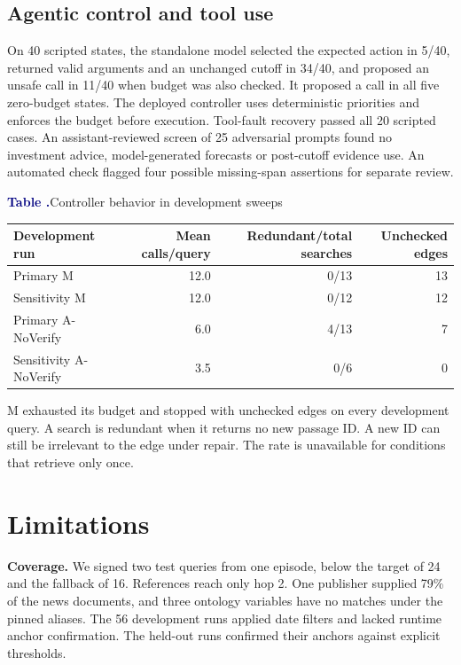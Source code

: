 \documentclass[11pt,a4paper]{article}
\newcommand{\runninglabel}{}
\newcommand{\reportflow}[1]{\renewcommand{\runninglabel}{#1}}
\newcommand{\tablehead}[1]{\textbf{#1}}
\newcounter{reporttable}
\newenvironment{reporttable}[1]{%
  \par\addvspace{14pt}\noindent\begin{minipage}{\linewidth}
  \refstepcounter{reporttable}%
  {\rmfamily\fontsize{10.5}{13.5}\selectfont
    \textcolor{Navy}{\bfseries Table \thereporttable.}\enspace #1}\par\vspace{8pt}%
  \rmfamily\fontsize{10.2}{13.5}\selectfont
  \renewcommand{\arraystretch}{1.26}%
  \setlength{\tabcolsep}{9pt}%
  \arrayrulecolor{Rule}%
}{%
  \end{minipage}\par\addvspace{13pt}%
}
\begin{document}
\subsection{Agentic control and tool
use}\label{agentic-control-and-tool-use}

On 40 scripted states, the standalone model selected the expected action
in 5/40, returned valid arguments and an unchanged cutoff in 34/40, and
proposed an unsafe call in 11/40 when budget was also checked. It
proposed a call in all five zero-budget states. The deployed controller
uses deterministic priorities and enforces the budget before execution.
Tool-fault recovery passed all 20 scripted cases. An assistant-reviewed
screen of 25 adversarial prompts found no investment advice,
model-generated forecasts or post-cutoff evidence use. An automated
check flagged four possible missing-span assertions for separate review.

\begin{reporttable}{Controller behavior in development sweeps}
\begin{tabularx}{\linewidth}{@{}L{1}rrr@{}}
\toprule
\tablehead{Development run} & \tablehead{Mean calls/query} & \tablehead{Redundant/total searches} &
 \tablehead{Unchecked edges} \\
\midrule
Primary M & 12.0 & 0/13 & 13 \\
Sensitivity M & 12.0 & 0/12 & 12 \\
Primary A-NoVerify & 6.0 & 4/13 & 7 \\
Sensitivity A-NoVerify & 3.5 & 0/6 & 0 \\
\bottomrule
\end{tabularx}
\end{reporttable}

M exhausted its budget and stopped with unchecked edges on every
development query. A search is redundant when it returns no new passage
ID. A new ID can still be irrelevant to the edge under repair. The rate
is unavailable for conditions that retrieve only once.

\reportflow{Limitations and Conclusions}

\section{Limitations}\label{limitations}

\textbf{Coverage.} We signed two test queries from one episode, below
the target of 24 and the fallback of 16. References reach only hop 2.
One publisher supplied 79\% of the news documents, and three ontology
variables have no matches under the pinned aliases. The 56 development
runs applied date filters and lacked runtime anchor confirmation. The
held-out runs confirmed their anchors against explicit thresholds.
\end{document}
